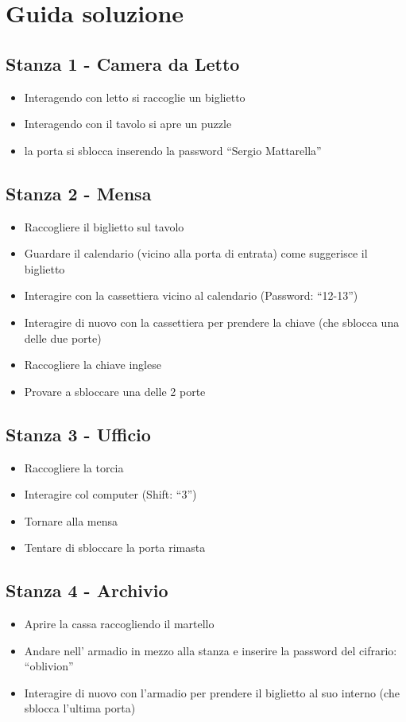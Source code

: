 \documentclass[a4paper,12pt]{report}
\begin{document}
\chapter{Guida soluzione}
%
\section{Stanza 1 - Camera da Letto}
\begin{itemize}
	\item Interagendo con letto si raccoglie un biglietto 
	\item Interagendo con il tavolo si apre un puzzle 
	\item la porta si sblocca inserendo la password “Sergio Mattarella”
\end{itemize}
%
\section{Stanza 2 - Mensa}
\begin{itemize}
	\item Raccogliere il biglietto sul tavolo 
	\item Guardare il calendario (vicino alla porta di entrata) come suggerisce il biglietto 
	\item Interagire con la cassettiera vicino al calendario (Password: “12-13”) 
	\item Interagire di nuovo con la cassettiera per prendere la chiave (che sblocca una delle due porte) 
	\item Raccogliere la chiave inglese  
	\item Provare a sbloccare una delle 2 porte
\end{itemize}
%
\section{Stanza 3 - Ufficio}
\begin{itemize}
	\item Raccogliere la torcia 
	\item Interagire col computer (Shift: “3”) 
	\item Tornare alla mensa 
	\item Tentare di sbloccare la porta rimasta 
\end{itemize}
%
\section{Stanza 4 - Archivio}
\begin{itemize}
	\item Aprire la cassa raccogliendo il martello
	\item Andare nell’ armadio in mezzo alla stanza e inserire la password del cifrario: “oblivion” 
	\item Interagire di nuovo con l’armadio per prendere il biglietto al suo interno (che sblocca l’ultima porta) 
\end{itemize}
%
\end{document}
